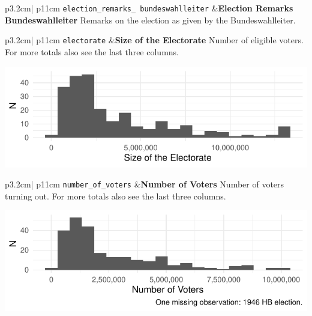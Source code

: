 \documentclass[
]{article}
\begin{document}
\begin{longtable}{p{3.2cm}| p{11cm}}
\texttt{election\_remarks\_
bundeswahlleiter} &\textbf{Election Remarks Bundeswahlleiter}\newline 
Remarks on the election as given by the Bundeswahlleiter.
\end{longtable}

\begin{longtable}{p{3.2cm}| p{11cm}}
\texttt{electorate} &\textbf{Size of the Electorate}\newline 
Number of eligible voters. For more totals also see the last three columns.

\hspace*{.25cm}
\begin{minipage}[t]{\linewidth }
\vspace{0pt}
\includegraphics[width = \linewidth]{cbelec/electorateplot.pdf}
\end{minipage}


\end{longtable}

\begin{longtable}{p{3.2cm}| p{11cm}}
\texttt{number\_of\_voters} &\textbf{Number of Voters}\newline 
Number of voters turning out. For more totals also see the last three columns.

\hspace*{.25cm}
\begin{minipage}[t]{\linewidth }
\vspace{0pt}
\includegraphics[width = \linewidth]{cbelec/nvotersplot.pdf}
\end{minipage}


\end{longtable}
\end{document}
